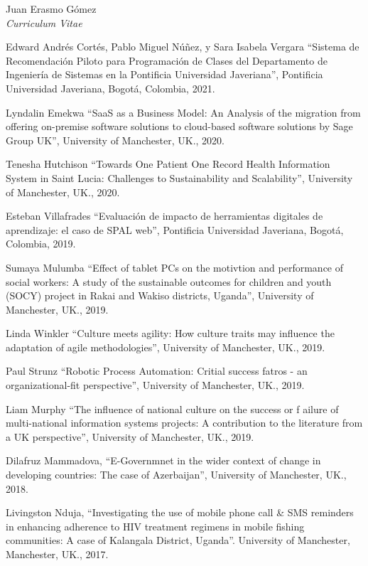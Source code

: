 \documentclass[10pt]{article}
\newenvironment{subbulletlist}{%
  \begin{list}{\labelitemii}{%
      \setlength{\topsep}{\itemsep}\setlength{\parskip}{\parsep}%
    }%
  }%
  { \end{list} }
\begin{document}
\begin{cv}{Juan Erasmo Gómez\\{\large \itshape Curriculum Vitae}}
  \begin{cvlist}{}
  \item \textbf{}
    \begin{subbulletlist}
    \item Edward Andrés Cortés, Pablo Miguel Núñez, y Sara Isabela Vergara ``Sistema de Recomendación Piloto para Programación de Clases del Departamento de Ingeniería de Sistemas en la Pontificia Universidad Javeriana'', Pontificia Universidad Javeriana, Bogotá, Colombia, 2021.
    \item Lyndalin Emekwa ``SaaS as a Business Model: An Analysis of the migration from offering on-premise software solutions to cloud-based software solutions by Sage Group UK'', University of Manchester, UK., 2020.
    \item Tenesha Hutchison ``Towards One Patient One Record Health Information System in Saint Lucia: Challenges to Sustainability and Scalability'', University of Manchester, UK., 2020.
    \item Esteban Villafrades ``Evaluación de impacto de herramientas digitales de aprendizaje: el caso de SPAL web'', Pontificia Universidad Javeriana, Bogotá, Colombia, 2019.
    \item Sumaya Mulumba ``Effect of tablet PCs on the motivtion and performance of social workers: A study of the sustainable outcomes for children and youth (SOCY) project in Rakai and Wakiso districts, Uganda'', University of Manchester, UK., 2019.
    \item Linda Winkler ``Culture meets agility: How culture traits may influence the adaptation of agile methodologies'', University of Manchester, UK., 2019.
    \item Paul Strunz ``Robotic Process Automation: Critial success fatros - an organizational-fit perspective'', University of Manchester, UK., 2019.
    \item Liam Murphy ``The influence of national culture on the success or f
      ailure of multi-national information systems projects: A contribution to the literature from a UK perspective'', University of Manchester, UK., 2019.  
    \item Dilafruz Mammadova, ``E-Governmnet in the wider context of change in developing countries: The case of Azerbaijan'', University of Manchester, UK., 2018.
    \item Livingston Nduja, ``Investigating the use of mobile phone call \& SMS reminders in enhancing adherence to HIV treatment regimens in mobile fishing communities: A case of Kalangala District, Uganda''. University of Manchester, Manchester, UK., 2017.

\end{subbulletlist}
\end{cvlist}
\end{cv}
\end{document}
